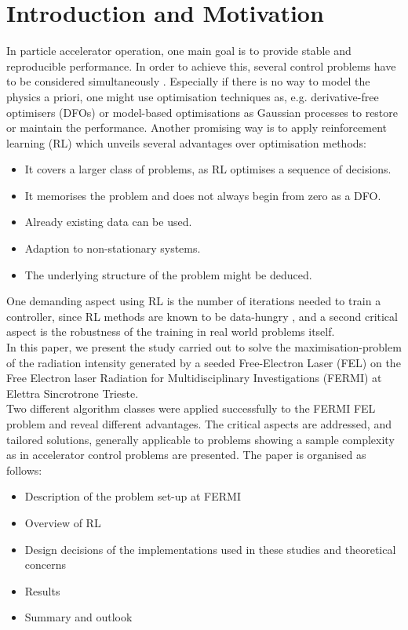 \documentclass[
reprint,
amsmath,amssymb,amsfonts,clevref,
aps,
prstab,
]{revtex4-2}
\begin{document}
	\section{Introduction and Motivation}
	In particle accelerator operation, one main goal is to provide stable and reproducible performance. In order to achieve this, several control problems have to be considered simultaneously \cite{Kain2020}. Especially if there is no way to model the physics a priori, one might use optimisation techniques as, e.g. derivative-free optimisers (DFOs) \cite{Huang2013,Bruchon2017,Scheinker2020,Hirlaender2019,Welsch2015} or model-based optimisations as Gaussian processes \cite{Hanuka2020,Roussel2020} to restore or maintain the performance. Another promising way is to apply reinforcement learning (RL) \cite{Bruchon2020,Bruchon2019,Kain2020,Pang2020} which unveils several advantages over optimisation methods:
	\begin{itemize}
		\item It covers a larger class of problems, as RL optimises a sequence of decisions.
		\item It memorises the problem and does not always begin from zero as a DFO.
		\item Already existing data can be used.
		\item Adaption to non-stationary systems.
		\item The underlying structure of the problem might be deduced.
	\end{itemize}
	One demanding aspect using RL is the number of iterations needed to train a controller, since RL methods are known to be data-hungry \cite{Sutton2018}, and a second critical aspect is the robustness of the training in real world problems itself.\\
	In this paper, we present the study carried out to solve the maximisation-problem of the radiation intensity generated by a seeded Free-Electron Laser (FEL) on the Free Electron laser Radiation for Multidisciplinary Investigations (FERMI) at Elettra Sincrotrone Trieste.\\
	 Two different algorithm classes were applied successfully to the FERMI FEL problem and reveal different advantages. The critical aspects are addressed, and tailored solutions, generally applicable to problems showing a sample complexity as in accelerator control problems are presented.
	The paper is organised as follows:
	\begin{itemize}
		\item Description of the problem set-up at FERMI
		\item Overview of RL
		\item Design decisions of the implementations used in these studies and theoretical concerns
		\item Results 
		\item Summary and outlook
	\end{itemize}
\end{document}
